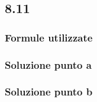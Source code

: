 \documentclass[../../main.tex]{subfiles}
\begin{document}
\subsection*{8.11}
\subsubsection*{Formule utilizzate}
\subsubsection*{Soluzione punto a}
\subsubsection*{Soluzione punto b}
\newpage
\end{document}
